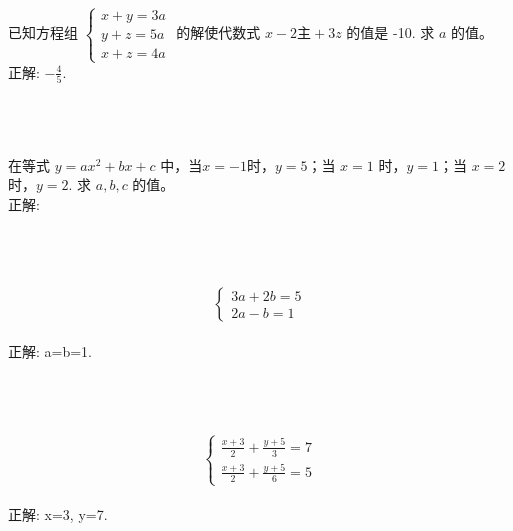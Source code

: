 \item {
    已知方程组
    $\begin{cases}
        x+y=3a \\ 
        y+z=5a \\ 
        x+z=4a 
    \end{cases}$
    的解使代数式 $x-2主+3z$ 的值是 -10.  求 $a$ 的值。
    \ifshowSolution
        \fangsong{}
        \\
        正解: $-\frac45$.
    \else
        \\ \\ \\  \\
    \fi
}

\item {
    在等式 $y=ax^2+bx+c$ 中，当$x=-1$时，$y=5$；当 $x=1$ 时，$y=1$；当 $x=2$时，$y=2$. 求 $a,b,c$ 的值。
    \ifshowSolution
        \fangsong{}
        \\
        正解: 
    \else
        \\ \\ \\  \\
    \fi
}

\item {
    \[\left\{
        \begin{array}{l}
            3a + 2b = 5 \\
            2a - b = 1
        \end{array}
    \right.\]
    \ifshowSolution
        \fangsong{}
        \\
        正解: a=b=1.
    \else
        \\ \\ \\ \\
    \fi
}

\item {
    \[\left\{
        \begin{array}{l}
            \frac{x+3}{2} + \frac{y+5}{3} = 7 \\
            \frac{x+3}{2} + \frac{y+5}{6} = 5
        \end{array}
    \right.\]
    \ifshowSolution
        \fangsong{}
        \\
        正解: x=3, y=7.
    \else
        \\ \\ \\ \\
    \fi
}